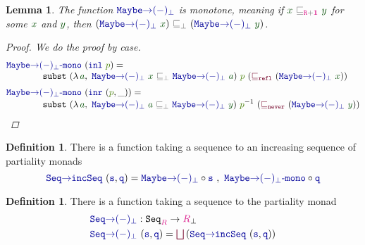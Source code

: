 \documentclass[twoside,11pt,openright]{report}
\theoremstyle{plain} %
\newtheorem{lem}[thm]{Lemma}
\theoremstyle{definition}
\newtheorem{defn}[thm]{Definition}%
\theoremstyle{remark}
\newcommand*{\term}[1]{\textcolor{green!30!black}{#1}} %
\newcommand*{\pathterm}[1]{\textcolor{green!65!red!75!black}{#1}}
\newcommand*{\type}[1]{\textcolor{magenta!90!black}{#1}}
\newcommand*{\unit}{\type{\textbf{1}}}
\newcommand*{\relation}[1]{\textcolor{gray!75!black}{\ensuremath{\mathtt{#1}}}}
\newcommand*{\function}[1]{\textcolor{blue!60!black}{\ensuremath{\mathtt{#1}}}}
\newcommand*{\constructor}[1]{\textcolor{purple!60!black}{\ensuremath{\mathtt{#1}}}}
\newcommand*{\typeformer}[1]{\ensuremath{\mathtt{#1}}}
\newcommand*{\sym}[1]{\ensuremath{#1^{-1}}}
\begin{document}
\begin{lem}
  The function \(\function{Maybe{\rightarrow}(-)_\bot}\) is monotone, meaning if \(\term{x}~\relation{\sqsubseteq_{\type{R} + \unit}}~\term{y}\) for some \(\term{x}\) and \(\term{y}\), then \((\function{Maybe{\rightarrow}(-)_\bot}~\term{x})~\relation{\sqsubseteq_{\bot}}~(\function{Maybe{\rightarrow}(-)_\bot}~\term{y})\).
  \begin{proof}
    We do the proof by case.
    \begin{equation}
      \begin{aligned}
        &\function{Maybe{\rightarrow}(-)_\bot\text{-}mono}~(\function{inl}~\pathterm{p}) = \\[-1mm]
        &\qquad\qquad \mathtt{subst}~(\lambda\,\term{a},~\function{Maybe{\rightarrow}(-)_\bot}~\term{x}~\relation{\sqsubseteq_{\bot}}~\function{Maybe{\rightarrow}(-)_\bot}~\term{a})~\pathterm{p}~(\constructor{\sqsubseteq_{refl}}~(\function{Maybe{\rightarrow}(-)_\bot}~\term{x})) \\[1mm]
        &\function{Maybe{\rightarrow}(-)_\bot\text{-}mono}~(\function{inr}~(\pathterm{p}, \_)) = \\[-1mm]
        &\qquad\qquad \mathtt{subst}~(\lambda\,\term{a},~\function{Maybe{\rightarrow}(-)_\bot}~\term{a}~\relation{\sqsubseteq_{\bot}}~\function{Maybe{\rightarrow}(-)_\bot}~\term{y})~\sym{\pathterm{p}}~(\constructor{\sqsubseteq_{never}}~(\function{Maybe{\rightarrow}(-)_\bot}~\term{y}))
      \end{aligned}
    \end{equation}
  \end{proof}
\end{lem}
\begin{defn}
  There is a function taking a sequence to an increasing sequence of partiality monads
  \begin{equation}
      \function{Seq{\rightarrow}incSeq}~(\function{s} , \function{q}) = \function{Maybe{\rightarrow}(-)_\bot} \circ \function{s}~,~\function{Maybe{\rightarrow}(-)_\bot\text{-}mono} \circ \function{q}
  \end{equation}
\end{defn}
\begin{defn}
  There is a function taking a sequence to the partiality monad
  \begin{equation}
    \begin{aligned}
      &\function{Seq{\rightarrow}(-)_\bot} : \typeformer{Seq}_{\type{R}} \rightarrow \type{R}_{\bot} \\
      &\function{Seq{\rightarrow}(-)_\bot}~(\function{s},\function{q}) = \constructor{\textstyle{\bigsqcup}}\,(\function{Seq{\rightarrow}incSeq}~(\function{s},\function{q}))
    \end{aligned}
  \end{equation}
\end{defn}
\end{document}

